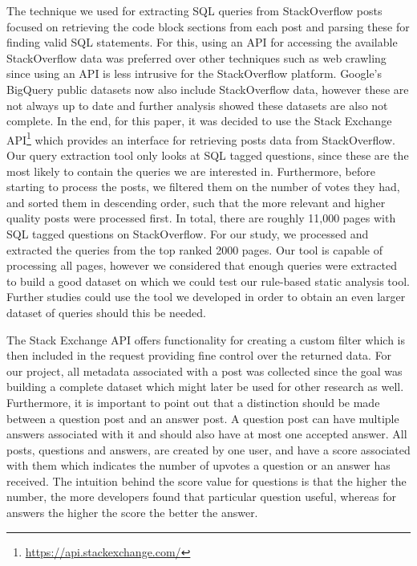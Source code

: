 The technique we used for extracting SQL queries from StackOverflow posts focused on retrieving the code block sections from each post and parsing these for finding valid SQL statements. For this, using an API for accessing the available StackOverflow data was preferred over other techniques such as web crawling since using an API is less intrusive for the StackOverflow platform. Google’s BigQuery public datasets now also include StackOverflow data, however these are not always up to date and further analysis showed these datasets are also not complete. In the end, for this paper, it was decided to use the Stack Exchange API\footnote{\url{https://api.stackexchange.com/}} which provides an interface for retrieving posts data from StackOverflow. Our query extraction tool only looks at SQL tagged questions, since these are the most likely to contain the queries we are interested in. Furthermore, before starting to process the posts, we filtered them on the number of votes they had, and sorted them in descending order, such that the more relevant and higher quality posts were processed first. In total, there are roughly 11,000 pages with SQL tagged questions on StackOverflow. For our study, we processed and extracted the queries from the top ranked 2000 pages. Our tool is capable of processing all pages, however we considered that enough queries were extracted to build a good dataset on which we could test our rule-based static analysis tool. Further studies could use the tool we developed in order to obtain an even larger dataset of queries should this be needed.

The Stack Exchange API offers functionality for creating a custom filter which is then included in the request providing fine control over the returned data. For our project, all metadata associated with a post was collected since the goal was building a complete dataset which might later be used for other research as well. Furthermore, it is important to point out that a distinction should be made between a question post and an answer post. A question post can have multiple answers associated with it and should also have at most one accepted answer. All posts, questions and answers, are created by one user, and have a score associated with them which indicates the number of upvotes a question or an answer has received. The intuition behind the score value for questions is that the higher the number, the more developers found that particular question useful, whereas for answers the higher the score the better the answer.

